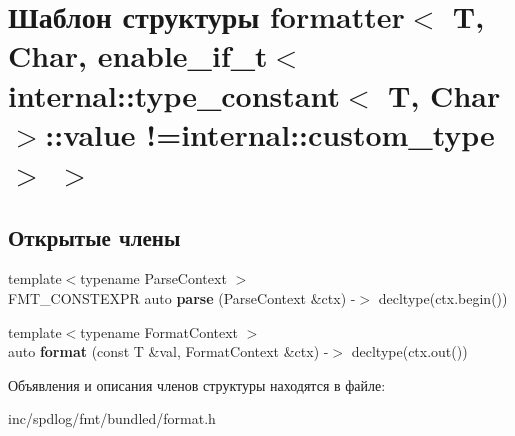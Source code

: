 \hypertarget{structformatter_3_01T_00_01Char_00_01enable__if__t_3_01internal_1_1type__constant_3_01T_00_01Cha949892e8956454061649f147df3d4a13}{}\section{Шаблон структуры formatter$<$ T, Char, enable\+\_\+if\+\_\+t$<$ internal\+:\+:type\+\_\+constant$<$ T, Char $>$\+:\+:value !=internal\+:\+:custom\+\_\+type $>$ $>$}
\label{structformatter_3_01T_00_01Char_00_01enable__if__t_3_01internal_1_1type__constant_3_01T_00_01Cha949892e8956454061649f147df3d4a13}
\subsection*{Открытые члены}
\begin{DoxyCompactItemize}
\item 
\mbox{\label{structformatter_3_01T_00_01Char_00_01enable__if__t_3_01internal_1_1type__constant_3_01T_00_01Cha949892e8956454061649f147df3d4a13_a438d7a0c77abf5b624c14656697ba29d}} 
{\footnotesize template$<$typename Parse\+Context $>$ }\\F\+M\+T\+\_\+\+C\+O\+N\+S\+T\+E\+X\+PR auto {\bfseries parse} (Parse\+Context \&ctx) -\/$>$ decltype(ctx.\+begin())
\item 
\mbox{\label{structformatter_3_01T_00_01Char_00_01enable__if__t_3_01internal_1_1type__constant_3_01T_00_01Cha949892e8956454061649f147df3d4a13_a57b8630293fb947c4cceea8d062e9fb3}} 
{\footnotesize template$<$typename Format\+Context $>$ }\\auto {\bfseries format} (const T \&val, Format\+Context \&ctx) -\/$>$ decltype(ctx.\+out())
\end{DoxyCompactItemize}


Объявления и описания членов структуры находятся в файле\+:\begin{DoxyCompactItemize}
\item 
inc/spdlog/fmt/bundled/format.\+h\end{DoxyCompactItemize}
